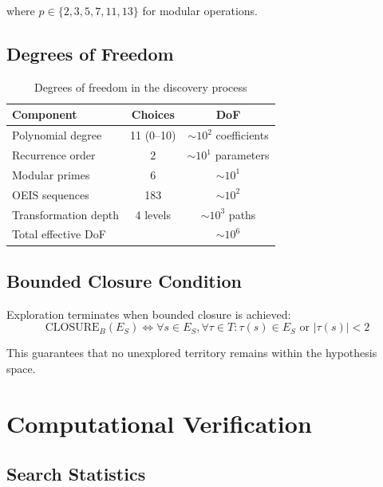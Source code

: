 \documentclass[12pt,a4paper]{article}
\begin{document}
where $p \in \{2, 3, 5, 7, 11, 13\}$ for modular operations.

\subsection{Degrees of Freedom}

\begin{table}[h]
\centering
\caption{Degrees of freedom in the discovery process}
\begin{tabular}{lcc}
\hline
Component & Choices & DoF \\
\hline
Polynomial degree & 11 (0--10) & $\sim 10^2$ coefficients \\
Recurrence order & 2 & $\sim 10^1$ parameters \\
Modular primes & 6 & $\sim 10^1$ \\
OEIS sequences & 183 & $\sim 10^2$ \\
Transformation depth & 4 levels & $\sim 10^3$ paths \\
\hline
Total effective DoF & & $\sim 10^6$ \\
\hline
\end{tabular}
\end{table}

\subsection{Bounded Closure Condition}

Exploration terminates when bounded closure is achieved:
\begin{equation}
\text{CLOSURE}_B(E_S) \Leftrightarrow \forall s \in E_S, \forall \tau \in T: 
\tau(s) \in E_S \text{ or } |\tau(s)| < 2
\end{equation}

This guarantees that no unexplored territory remains within the hypothesis space.

\section{Computational Verification}

\subsection{Search Statistics}
\end{document}
